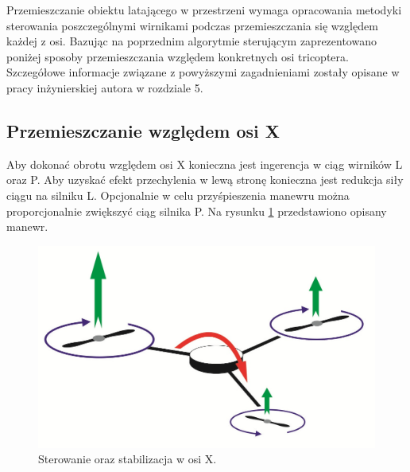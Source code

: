 Przemieszczanie obiektu latającego w przestrzeni wymaga opracowania metodyki sterowania poszczególnymi wirnikami podczas przemieszczania się względem każdej z osi.
Bazując na poprzednim algorytmie sterującym zaprezentowano poniżej sposoby przemieszczania względem konkretnych osi tricoptera. Szczegółowe informacje związane z powyższymi zagadnieniami zostały opisane w pracy inżynierskiej autora w rozdziale 5. %

\subsection{Przemieszczanie względem osi X}
Aby dokonać obrotu względem osi X konieczna jest ingerencja w ciąg wirników L oraz P. Aby uzyskać efekt przechylenia w lewą stronę konieczna jest redukcja siły ciągu na silniku L. Opcjonalnie w celu przyśpieszenia manewru można proporcjonalnie zwiększyć ciąg silnika P. Na rysunku \ref{fig:axis_x} przedstawiono opisany manewr.

\begin{figure}[!htbp]
\centering
\includegraphics[width=0.7\linewidth]{./include/axis_x}
\caption{Sterowanie oraz stabilizacja w osi X.}
\label{fig:axis_x}
\end{figure}


